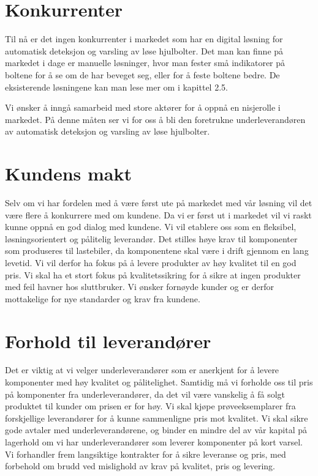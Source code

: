 \begin{table}[H]
\section{Konkurrenter}
Til nå er det ingen konkurrenter i markedet som har en digital løsning for 
automatisk deteksjon og varsling av løse hjulbolter. Det man kan finne på 
markedet i dage er manuelle løsninger, hvor man fester små indikatorer på 
boltene for å se om de har beveget seg, eller for å feste boltene bedre. De 
eksisterende løsningene kan man lese mer om i kapittel 2.5. %

Vi ønsker å inngå samarbeid med store aktører for å oppnå en nisjerolle i 
markedet. På denne måten ser vi for oss å bli den foretrukne 
underleverandøren av automatisk deteksjon og varsling av løse hjulbolter.

\section{Kundens makt}
Selv om vi har fordelen med å være først ute på markedet med vår løsning vil 
det være flere å konkurrere med om kundene. Da vi er først ut i markedet vil 
vi raskt kunne oppnå en god dialog med kundene. Vi vil etablere oss som en 
fleksibel, løsningsorientert og pålitelig leverandør. Det stilles høye krav 
til komponenter som produseres til lastebiler, da komponentene skal være i 
drift gjennom en lang levetid. Vi vil derfor ha fokus på å levere produkter 
av høy kvalitet til en god pris. Vi skal ha et stort fokus på 
kvalitetssikring for å sikre at ingen produkter med feil havner hos 
sluttbruker. Vi ønsker fornøyde kunder og er derfor mottakelige for nye 
standarder og krav fra kundene. 

\section{Forhold til leverandører}
Det er viktig at vi velger underleverandører som er anerkjent for å levere 
komponenter med høy kvalitet og pålitelighet. Samtidig må vi forholde oss til 
pris på komponenter fra underleverandører, da det vil være vanskelig å få 
solgt produktet til kunder om prisen er for høy. Vi skal kjøpe 
prøveeksemplarer fra forskjellige leverandører for å kunne sammenligne pris 
mot kvalitet. Vi skal sikre gode avtaler med underleverandørene, og binder en 
mindre del av vår kapital på lagerhold om vi har underleverandører som 
leverer komponenter på kort varsel. Vi forhandler frem langsiktige kontrakter 
for å sikre leveranse og pris, med forbehold om brudd ved mislighold av krav 
på kvalitet, pris og levering. 


\end{table}
